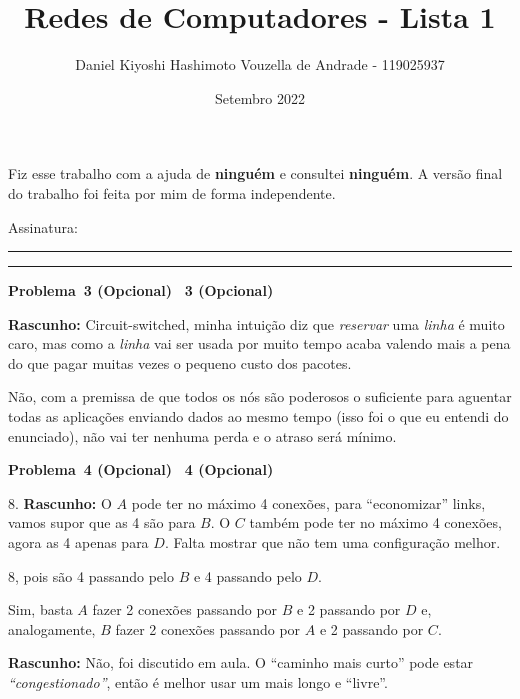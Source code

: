 \documentclass{article}
\title{Redes de Computadores - Lista 1}
\author{Daniel Kiyoshi Hashimoto Vouzella de Andrade - 119025937}
\date{Setembro 2022}
\newcommand{\blank}{\rule[0pt]{5em}{.3pt}}
\newcommand{\nobody}{ninguém}
\newcommand{\preamble}[2]{\noindent%
    Fiz esse trabalho com a ajuda de {\bfseries #1}
    e consultei {\bfseries #2}.
    A versão final do trabalho foi feita
    por mim de forma independente.
    \par\noindent Assinatura: \blank\blank\bigskip}
\newcounter{exe-list}
\newenvironment{exe-list}
    {\begin{list}{\alph{exe-list}.}{\usecounter{exe-list}}}
    {\end{list}}
\newenvironment{exe}[2][]
    {\newcommand{\opt}{(Opcional)}%
    \newcommand{\sketch}[1]{{\bfseries Rascunho:} ##1}%
    \newcommand{\nop}{\hspace{-1ex}}%
    \medskip\par\noindent\ifthenelse{\equal{#1}{}}
        {\textbf{\large Problema~#2}}
        {\textbf{\large #1~#2}}%
    \medskip\par\noindent}
    {\medskip}
\begin{document}
\maketitle

\preamble{\nobody}{\nobody}

\begin{exe}{3 \opt}
    \begin{exe-list}
    \item \sketch{Circuit-switched,
        minha intuição diz que
        \emph{reservar} uma \emph{linha} é muito caro,
        mas como a \emph{linha} vai ser usada por muito tempo
        acaba valendo mais a pena do que
        pagar muitas vezes o pequeno custo dos pacotes.}
    \item Não, com a premissa de que todos os nós são
        poderosos o suficiente para aguentar todas as aplicações
        enviando dados ao mesmo tempo
        (isso foi o que eu entendi do enunciado),
        não vai ter nenhuma perda e o atraso será mínimo.
    \end{exe-list}
\end{exe}

\begin{exe}{4 \opt}
    \begin{exe-list}
    \item 8.
        \sketch{O \(A\) pode ter no máximo 4 conexões,
        para ``economizar'' links,
        vamos supor que as 4 são para \(B\).
        O \(C\) também pode ter no máximo 4 conexões,
        agora as 4 apenas para \(D\).
        Falta mostrar que não tem uma configuração melhor.}
    \item 8, pois são 4 passando pelo \(B\) e 4 passando pelo \(D\).
    \item Sim, basta \(A\) fazer 2 conexões passando por \(B\) e
        2 passando por \(D\) e, analogamente,
        \(B\) fazer 2 conexões passando por \(A\) e
        2 passando por \(C\).
    \item \sketch{Não, foi discutido em aula.
        O ``caminho mais curto'' pode estar
        \emph{``congestionado''}, então é melhor usar um
        mais longo e ``livre''.}
    \end{exe-list}
\end{exe}
\end{document}

